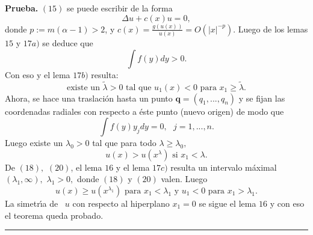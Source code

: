 \documentclass{article}
\newenvironment{proof}[1][Prueba]{\textbf{#1.} }{\ \rule{0.5em}{0.5em}}
\begin{document}
\begin{proof}
$\left( 15\right) $ se puede escribir de la forma 
\begin{equation*}
\Delta u+c\left( x\right) u=0,
\end{equation*}
donde $p:=m\left( \alpha -1\right) >2$, y $c\left( x\right) =\frac{g\left(
u\left( x\right) \right) }{u\left( x\right) }=O\left( \left\vert
x\right\vert ^{-p}\right) .$ Luego de los lemas $15$ y $17a)$ se deduce que 
\begin{equation}
\int f\left( y\right) dy>0.  \tag{17}
\end{equation}
Con eso y el lema $17b)$ resulta: 
\begin{equation}
\text{existe un }\widetilde{\lambda }>0\text{ \ \ tal que \ \ }u_{1}\left(
x\right) <0\text{ para }x_{1}\geq \widetilde{\lambda }\text{.}  \tag{18}
\end{equation}
Ahora, se hace una traslaci\'{o}n hasta un punto $\mathbf{q=}\left(
q_{1},...,q_{n}\right) $ y se fijan las coordenadas radiales con respecto a
\'{e}ste punto (nuevo origen) de modo que 
\begin{equation}
\int f\left( y\right) y_{j}dy=0,\text{ \ \ }j=1,...,n.  \tag{19}
\end{equation}
Luego existe un $\lambda _{0}>0$ tal que para todo $\lambda \geq \lambda
_{0},$ 
\begin{equation}
u\left( x\right) >u\left( x^{\lambda }\right) \text{ \ \ si }x_{1}<\lambda 
\text{.}  \tag{20}
\end{equation}
De $\left( 18\right) ,$ $\left( 20\right) $, el lema $16$ y el lema $17c)$
resulta un intervalo m\'{a}ximal $\left( \lambda _{1},\infty \right) ,$ $%
\lambda _{1}>0,$ donde $\left( 18\right) $ y $\left( 20\right) $ valen.
Luego 
\begin{equation*}
u\left( x\right) \geq u\left( x^{\lambda _{1}}\right) \text{ para\ }%
x_{1}<\lambda _{1}\text{ \ \ y \ \ }u_{1}<0\text{ para }x_{1}>\lambda _{1}%
\text{.}
\end{equation*}
La simetr\'{\i}a de \ $u$ con respecto al hiperplano $x_{1}=0$ se sigue el
lema $16$ y con eso el teorema queda probado.
\end{proof}
\end{document}
